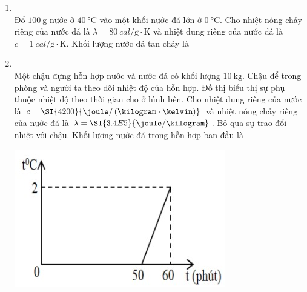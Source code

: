 \begin{enumerate}[label=\bfseries Câu \arabic*:, leftmargin=1.7cm]
\item {}\\
Đổ $\SI{100}{\gram}$ nước ở $\SI{40}{\celsius}$ vào một khối nước đá lớn ở $\SI{0}{\celsius}$. Cho nhiệt nóng chảy riêng của nước đá là $\lambda=\SI{80}{cal/\gram\cdot\kelvin}$ và nhiệt dung riêng của nước đá là $c=\SI{1}{cal/\gram\cdot\kelvin}$. Khối lượng nước đá tan chảy là


\item {}\\
Một chậu đựng hỗn hợp nước và nước đá có khối lượng $\SI{10}{\kilogram}$. Chậu để trong phòng và người ta theo dõi nhiệt độ của hỗn hợp. Đồ thị biểu thị sự phụ thuộc nhiệt độ theo thời gian cho ở hình bên. Cho nhiệt dung riêng của nước là $c=\SI{4200}{\joule/\left(\kilogram\cdot\kelvin\right)}$ và nhiệt nóng chảy riêng của nước đá là $\lambda=\SI{3.4E5}{\joule/\kilogram}$. Bỏ qua sự trao đổi nhiệt với chậu. Khối lượng nước đá trong hỗn hợp ban đầu là
\begin{center}
	\includegraphics[width=0.4\linewidth]{../figs/VN12-Y24-PH-SYL-005P-1}
\end{center}


\end{enumerate}
